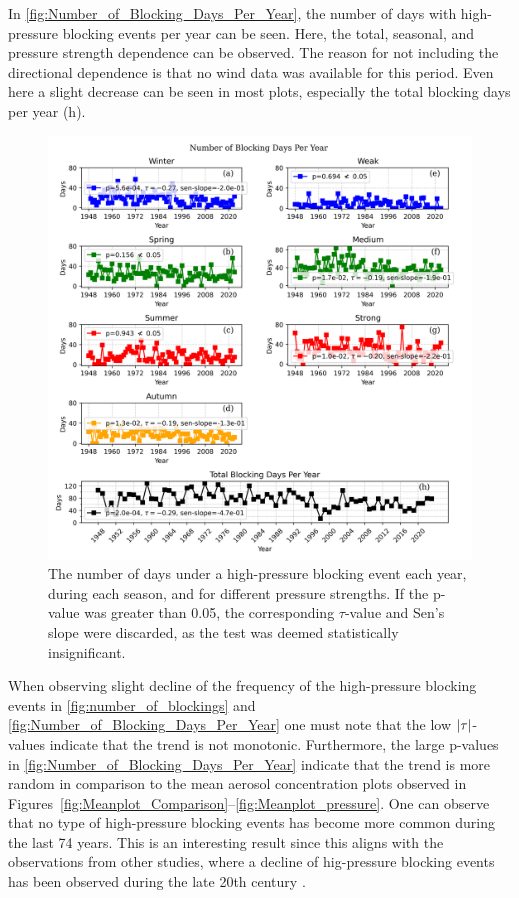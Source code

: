 In \autoref{fig:Number_of_Blocking_Days_Per_Year}, the number of days with high-pressure blocking events per year can be seen. Here, the total, seasonal, and pressure strength dependence can be observed. The reason for not including the directional dependence is that no wind data was available for this period. Even here a slight decrease can be seen in most plots, especially the total blocking days per year (h). 


\begin{figure}[H]
    \centering
    \includegraphics[width=\textwidth]{Figures/blocking_days_per_year_all.png}
    \caption{The number of days under a high-pressure blocking event each year, during each season, and for different pressure strengths. If the p-value was greater than 0.05, the corresponding $\tau$-value and Sen's slope were discarded, as the test was deemed statistically insignificant.} 
    \label{fig:Number_of_Blocking_Days_Per_Year}
\end{figure}

When observing slight decline of the frequency of the high-pressure blocking events in \autoref{fig:number_of_blockings} and \autoref{fig:Number_of_Blocking_Days_Per_Year} one must note that the low $\left| \tau \right|$-values indicate that the trend is not monotonic. Furthermore, the large p-values in \autoref{fig:Number_of_Blocking_Days_Per_Year} indicate that the trend is more random in comparison to the mean aerosol concentration plots observed in Figures~\ref{fig:Meanplot_Comparison}--\ref{fig:Meanplot_pressure}. One can observe that no type of high-pressure blocking events has become more common during the last 74 years. This is an interesting result since this aligns with the observations from other studies, where a decline of hig-pressure blocking events has been observed during the late 20th century \cite{lupoAtmosphericBlockingEvents2020}. 
